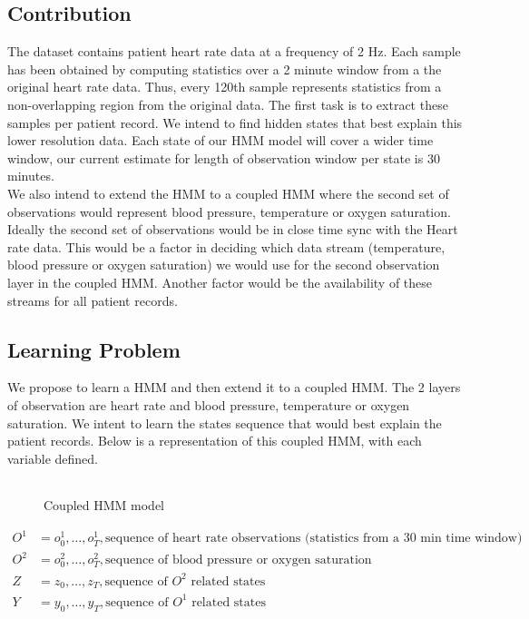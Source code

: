 \documentclass[12pt,solutions]{article}
\begin{document}
\subsection{Contribution}
The dataset contains patient heart rate data at a frequency of 2 Hz. Each sample has been obtained by computing statistics over a 2 minute window from a the original heart rate data. Thus, every 120th sample represents statistics from a non-overlapping region from the original data. The first task is to extract these samples per patient record. We intend to find hidden states that best explain this lower resolution data. Each state of our HMM model will cover a wider time window, our current estimate for length of observation window per state is 30 minutes.\\
We also intend to extend the HMM to a coupled HMM where the second set of observations would represent blood pressure, temperature or oxygen saturation. Ideally the second set of observations would be in close time sync with the Heart rate data. This would be a factor in deciding which data stream (temperature, blood pressure or oxygen saturation) we would use for the second observation layer in the coupled HMM. Another factor would be the availability of these streams for all patient records. \\
\subsection{Learning Problem}
We propose to learn a HMM and then extend it to a coupled HMM. The 2 layers of observation are heart rate and blood pressure, temperature or oxygen saturation.  We intent to learn the states sequence that would best explain the patient records. Below is a representation of this coupled HMM, with each variable defined.\\
\begin{figure}[ht]
  \begin{center}
    \begin{tabular}{cc}
      
    \end{tabular}
  \end{center}
  \caption{Coupled HMM model}
\label{fig:reclas_bnet}
\end{figure}
\begin{align*}
O^1 &= o^1_{0}, \ldots,o^1_{T},   \text{sequence of heart rate observations (statistics from a 30 min time window)}\\
O^2 &=o^2_{0}, \ldots,o^2_{T},  \text{sequence of blood pressure or oxygen saturation}\\
Z &=  z_{0}, \ldots,z_{T}, \text{sequence of ${O^2}$ related states}\\
Y &=  y_{0}, \ldots,y_{T},  \text{sequence of ${O^1}$ related states}\\
\end{align*}
\end{document}
